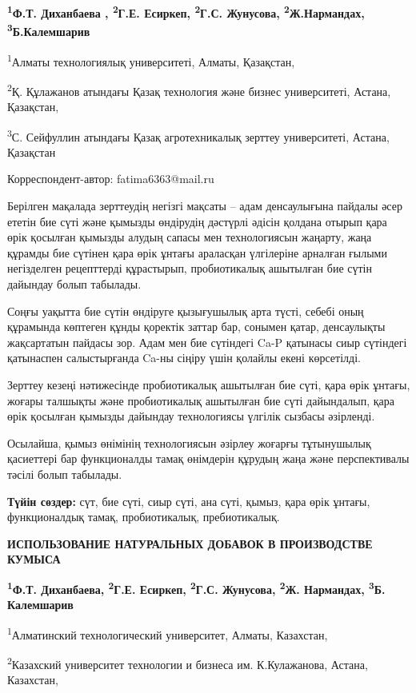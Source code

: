 {\bfseries \textsuperscript{1}Ф.Т. Диханбаева , \textsuperscript{2}Г.Е.
Есиркеп, \textsuperscript{2}Г.С. Жунусова,
\textsuperscript{2}Ж.Нармандах, \textsuperscript{3}Б.Калемшарив}

\textsuperscript{1}Алматы технологиялық университеті, Алматы, Қазақстан,

\textsuperscript{2}Қ. Құлажанов атындағы Қазақ технология және бизнес
университеті, Астана, Қазақстан,

\textsuperscript{3}С. Сейфуллин атындағы Қазақ агротехникалық зерттеу
университеті, Астана, Қазақстан

Корреспондент-автор: fatima6363@mail.ru

Берілген мақалада зерттеудің негізгі мақсаты -- адам денсаулығына
пайдалы әсер ететін бие сүті және қымызды өндірудің дәстүрлі әдісін
қолдана отырып қара өрік қосылған қымызды алудың сапасы мен
технологиясын жаңарту, жаңа құрамды бие сүтінен қара өрік ұнтағы
араласқан үлгілеріне арналған ғылыми негізделген рецепттерді құрастырып,
пробиотикалық ашытылған бие сүтін дайындау болып табылады.

Соңғы уақытта бие сүтін өндіруге қызығушылық арта түсті, себебі оның
құрамында көптеген құнды қоректік заттар бар, сонымен қатар, денсаулықты
жақсартатын пайдасы зор. Адам мен бие сүтіндегі Ca-P қатынасы сиыр
сүтіндегі қатынаспен салыстырғанда Ca-ны сіңіру үшін қолайлы екені
көрсетілді.

Зерттеу кезеңі нәтижесінде пробиотикалық ашытылған бие сүті, қара өрік
ұнтағы, жоғары талшықты және пробиотикалық ашытылған бие сүті
дайындалып, қара өрік қосылған қымызды дайындау технологиясы үлгілік
сызбасы әзірленді.

Осылайша, қымыз өнімінің технологиясын әзірлеу жоғарғы тұтынушылық
қасиеттері бар функционалды тамақ өнімдерін құрудың жаңа және
перспективалы тәсілі болып табылады.

{\bfseries Түйін сөздер:} сүт, бие сүті, сиыр сүті, ана сүті, қымыз, қара
өрік ұнтағы, функционалдық тамақ, пробиотикалық, пребиотикалық.

{\bfseries ИСПОЛЬЗОВАНИЕ НАТУРАЛЬНЫХ ДОБАВОК В ПРОИЗВОДСТВЕ КУМЫСА}

{\bfseries \textsuperscript{1}Ф.Т. Диханбаева, \textsuperscript{2}Г.Е.
Есиркеп, \textsuperscript{2}Г.С. Жунусова, \textsuperscript{2}Ж.
Нармандах, \textsuperscript{3}Б. Калемшарив}

\textsuperscript{1}Алматинский технологический университет, Алматы,
Казахстан,

\textsuperscript{2}Казахский университет технологии и бизнеса им.
К.Кулажанова, Астана, Казахстан,

